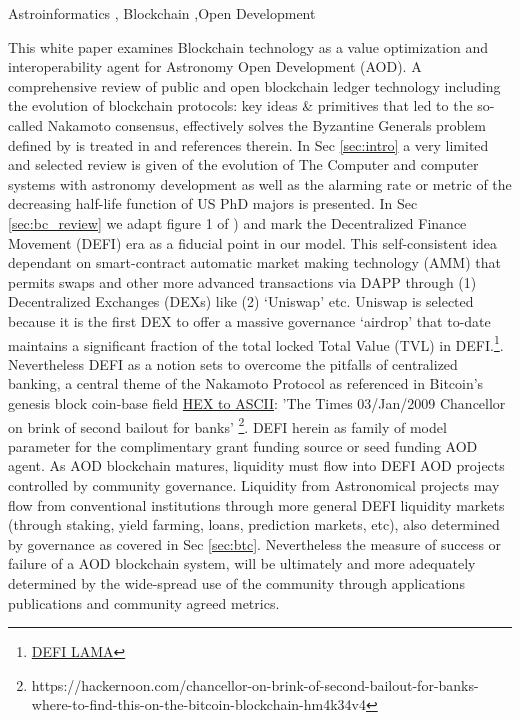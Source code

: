 \documentclass[final,5p,times,twocolumn,authoryear]{elsarticle}
\begin{document}
\begin{frontmatter}



\begin{keyword}
   Astroinformatics \sep 
Blockchain \sep Open Development
\end{keyword}
\end{frontmatter}

This white paper examines Blockchain technology as a value optimization and interoperability agent for Astronomy Open Development (AOD). A comprehensive review of public and open blockchain ledger technology including the evolution of blockchain protocols: key ideas \& primitives that led to the  so-called Nakamoto consensus, effectively solves the Byzantine Generals problem defined by \cite{Lamport1982TheBG} is treated in  \cite{arvindandclark2017} and references therein. In Sec \ref{sec:intro} a very limited and selected review is given of the evolution of The Computer and computer systems with astronomy development as well as the alarming rate or metric of the decreasing half-life function of US PhD majors \cite{milo_2018} is presented. In Sec \ref{sec:bc_review} we adapt figure 1 of \cite{arvindandclark2017}) and mark the Decentralized Finance Movement (DEFI) era as a fiducial point in our model. This self-consistent idea dependant on smart-contract automatic market making technology (AMM) that permits swaps and other more advanced transactions via DAPP through (1) Decentralized Exchanges (DEXs) like (2) `Uniswap' etc. Uniswap is selected because it is the first DEX to offer a massive governance `airdrop' that to-date maintains a significant fraction of the total locked Total Value (TVL) in DEFI.\footnote{\href{https://defillama.com/protocols/dexes}{DEFI LAMA}}. Nevertheless DEFI as a notion sets to overcome the pitfalls of centralized banking, a central theme of the Nakamoto Protocol as referenced in Bitcoin's genesis block \textrm{coin-base field} \href{https://www.blockchain.com/btc/tx/4a5e1e4baab89f3a32518a88c31bc87f618f76673e2cc77ab2127b7afdeda33b}{HEX to ASCII}:  'The Times 03/Jan/2009 Chancellor on brink of second bailout for banks' \footnote{https://hackernoon.com/chancellor-on-brink-of-second-bailout-for-banks-where-to-find-this-on-the-bitcoin-blockchain-hm4k34v4}. DEFI herein as family of model parameter for the complimentary grant funding source or seed funding AOD agent. As AOD blockchain matures, liquidity must flow into DEFI AOD projects controlled by community governance. Liquidity from Astronomical projects may flow from conventional institutions through more general DEFI liquidity markets (through staking, yield farming, loans, prediction markets, etc), also determined by governance as covered in Sec \ref{sec:btc}. Nevertheless the measure of success or failure of a AOD blockchain system, will be ultimately and more adequately determined by the wide-spread use of the community through applications publications and community agreed metrics. 
\end{document}
